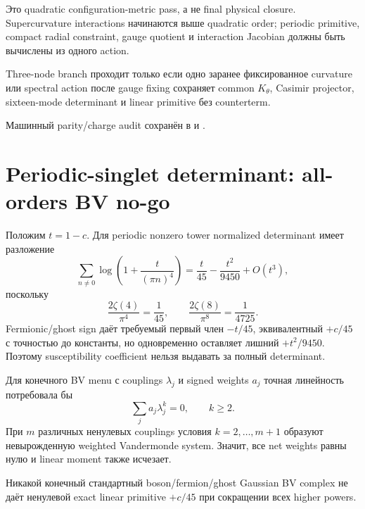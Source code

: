 Это quadratic configuration-metric pass, а не final physical closure.
Supercurvature interactions начинаются выше quadratic order; periodic
primitive, compact radial constraint, gauge quotient и interaction Jacobian
должны быть вычислены из одного action.

\begin{nogocriterion}
Three-node branch проходит только если одно заранее фиксированное curvature
или spectral action после gauge fixing сохраняет common \(K_\theta\), Casimir
projector, sixteen-mode determinant и linear primitive без counterterm.
\end{nogocriterion}

Машинный parity/charge audit сохранён в
 и
.

\section{Periodic-singlet determinant: all-orders BV no-go}

Положим \(t=1-c\). Для periodic nonzero tower normalized determinant имеет
разложение
\begin{equation}
 \sum_{n\ne0}\log\left(1+\frac{t}{(\pi n)^4}\right)
 =\frac{t}{45}-\frac{t^2}{9450}+O(t^3),
\end{equation}
поскольку
\begin{equation}
 \frac{2\zeta(4)}{\pi^4}=\frac1{45},
 \qquad
 \frac{2\zeta(8)}{\pi^8}=\frac1{4725}.
\end{equation}
Fermionic/ghost sign даёт требуемый первый член \(-t/45\), эквивалентный
\(+c/45\) с точностью до константы, но одновременно оставляет лишний
\(+t^2/9450\). Поэтому susceptibility coefficient нельзя выдавать за полный
determinant.

Для конечного BV menu с couplings \(\lambda_j\) и signed weights \(a_j\)
точная линейность потребовала бы
\begin{equation}
 \sum_j a_j\lambda_j^k=0,
 \qquad k\ge2.
\end{equation}
При \(m\) различных ненулевых couplings условия \(k=2,\ldots,m+1\)
образуют невырожденную weighted Vandermonde system. Значит, все net weights
равны нулю и linear moment также исчезает.

\begin{theorem}
Никакой конечный стандартный boson/fermion/ghost Gaussian BV complex не даёт
ненулевой exact linear primitive \(+c/45\) при сокращении всех higher powers.
\end{theorem}

